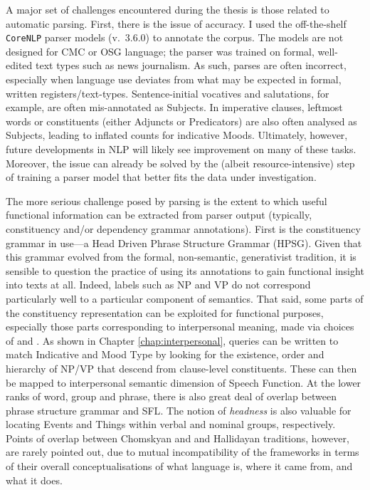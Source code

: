 A major set of challenges encountered during the thesis is those related to automatic parsing. First, there is the issue of accuracy. I used the off\hyp{}the\hyp{}shelf \texttt{CoreNLP} parser models (v.~3.6.0) to annotate the corpus. The models are not designed for \gls{CMC} or \gls{OSG} language; the parser was trained on formal, well\hyp{}edited text types such as news journalism. As such, parses are often incorrect, especially when language use deviates from what may be expected in formal, written registers\slash text\hyp{}types. Sentence\hyp{}initial vocatives and salutations, for example, are often mis\hyp{}annotated as Subjects. In imperative clauses, leftmost words or constituents (either Adjuncts or Predicators) are also often analysed as Subjects, leading to inflated counts for indicative Moods. Ultimately, however, future developments in \gls{NLP} will likely see improvement on many of these tasks. Moreover, the issue can already be solved by the (albeit resource-intensive) step of training a parser model that better fits the data under investigation.

The more serious challenge posed by parsing is the extent to which useful functional information can be extracted from parser output (typically, constituency and\slash or dependency grammar annotations). First is the constituency grammar in use---a Head Driven Phrase Structure Grammar (HPSG). Given that this grammar evolved from the formal, non\hyp{}semantic, generativist tradition, it is sensible to question the practice of using its annotations to gain functional insight into texts at all. Indeed, labels such as NP and VP do not correspond particularly well to a particular component of semantics. That said, some parts of the constituency representation can be exploited for functional purposes, especially those parts corresponding to interpersonal meaning, made via choices of  and . As shown in Chapter \ref{chap:interpersonal}, queries can be written to match Indicative and Mood Type by looking for the existence, order and hierarchy of NP\slash VP that descend from clause\hyp{}level constituents. These can then be mapped to interpersonal semantic dimension of Speech Function.  At the lower ranks of word, group and phrase, there is also great deal of overlap between phrase structure grammar and \gls{SFL}. The notion of \emph{headness} is also valuable for locating Events and Things within verbal and nominal groups, respectively. Points of overlap between Chomskyan and and Hallidayan traditions, however, are rarely pointed out, due to mutual incompatibility of the frameworks in terms of their overall conceptualisations of what language is, where it came from, and what it does.

